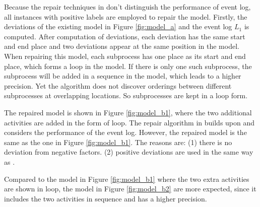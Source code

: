 Because the repair techniques in \cite{fahland2015model} don't distinguish the performance of event log, all instances with positive labels are employed to repair the model. Firstly, the deviations of the existing model in Figure \ref{fig:model_a} and the event log $L_1$ is computed. After computation of deviations, each deviation has the same start and end place and two deviations appear at the same position in the model. When repairing this model, each subprocess has one place as its start and end place, which forms a loop in the model. If there is only one such subprocess, the subprocess will be added in a sequence in the model, which leads to a higher precision. Yet the algorithm does not discover orderings between different subprocesses at overlapping locations. So subprocesses are kept in a loop form. 

The repaired model is shown in Figure \ref{fig:model_b1}, where the two additional activities are added in the form of loop. The repair algorithm in \cite{dees2017enhancing} builds upon \cite{fahland2015model} and considers the performance of the event log. However, the repaired model is the same as the one in Figure \ref{fig:model_b1}. The reasons are: (1) there is no deviation from negative factors. (2) positive deviations are used in the same way as \cite{fahland2015model}. 

Compared to the model in Figure \ref{fig:model_b1} where the two extra activities are shown in loop, the model in Figure \ref{fig:model_b2} are more expected, since it includes the two activities in sequence and has a higher precision.

